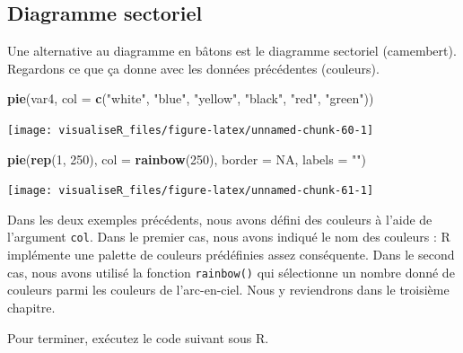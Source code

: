 \documentclass[]{article}
\newenvironment{Shaded}{\begin{snugshade}}{\end{snugshade}}
\newcommand{\DataTypeTok}[1]{\textcolor[rgb]{0.13,0.29,0.53}{#1}}
\newcommand{\DecValTok}[1]{\textcolor[rgb]{0.00,0.00,0.81}{#1}}
\newcommand{\KeywordTok}[1]{\textcolor[rgb]{0.13,0.29,0.53}{\textbf{#1}}}
\newcommand{\NormalTok}[1]{#1}
\newcommand{\OtherTok}[1]{\textcolor[rgb]{0.56,0.35,0.01}{#1}}
\newcommand{\StringTok}[1]{\textcolor[rgb]{0.31,0.60,0.02}{#1}}
\begin{document}
\hypertarget{diagramme-sectoriel}{%
\subsection{Diagramme sectoriel}\label{diagramme-sectoriel}}

Une alternative au diagramme en bâtons est le diagramme sectoriel (camembert). Regardons ce que ça donne avec les données précédentes (couleurs).

\begin{Shaded}
\begin{Highlighting}[]
\KeywordTok{pie}\NormalTok{(var4, }\DataTypeTok{col =} \KeywordTok{c}\NormalTok{(}\StringTok{"white"}\NormalTok{, }\StringTok{"blue"}\NormalTok{, }\StringTok{"yellow"}\NormalTok{, }\StringTok{"black"}\NormalTok{, }\StringTok{"red"}\NormalTok{, }\StringTok{"green"}\NormalTok{))}
\end{Highlighting}
\end{Shaded}

\begin{center}\texttt{[image: visualiseR\_files/figure-latex/unnamed-chunk-60-1]} \end{center}

\begin{Shaded}
\begin{Highlighting}[]
\KeywordTok{pie}\NormalTok{(}\KeywordTok{rep}\NormalTok{(}\DecValTok{1}\NormalTok{, }\DecValTok{250}\NormalTok{), }\DataTypeTok{col =} \KeywordTok{rainbow}\NormalTok{(}\DecValTok{250}\NormalTok{), }\DataTypeTok{border =} \OtherTok{NA}\NormalTok{, }\DataTypeTok{labels =} \StringTok{""}\NormalTok{)}
\end{Highlighting}
\end{Shaded}

\begin{center}\texttt{[image: visualiseR\_files/figure-latex/unnamed-chunk-61-1]} \end{center}

Dans les deux exemples précédents, nous avons défini des couleurs à l'aide de l'argument \texttt{col}. Dans le premier cas, nous avons indiqué le nom des couleurs : R implémente une palette de couleurs prédéfinies assez conséquente. Dans le second cas, nous avons utilisé la fonction \texttt{rainbow()} qui sélectionne un nombre donné de couleurs parmi les couleurs de l'arc-en-ciel. Nous y reviendrons dans le troisième chapitre.

Pour terminer, exécutez le code suivant sous R.
\end{document}

